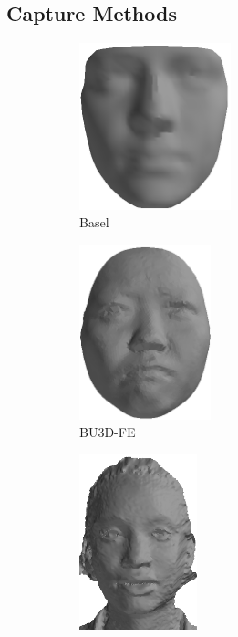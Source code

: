 \subsection{Capture Methods}\label{subsec:bg_capture}
\begin{figure}[h]
	\centering
	\begin{subfigure}[b]{0.3\textwidth}
		\centering
		\includegraphics[height=1.9in]{background/images/basel}
		\caption{Basel~\cite{paysan20093d}}\label{fig:db_examples_basel}
	\end{subfigure}
	\begin{subfigure}[b]{0.3\textwidth}
		\centering
		\includegraphics[height=2in]{background/images/bu3d}
		\caption{BU3D-FE~\cite{Yin:2006cc}}\label{fig:db_examples_bu3d}
	\end{subfigure}
	\begin{subfigure}[b]{0.3\textwidth}
		\centering
		\includegraphics[height=2in]{background/images/bp4d}

\end{subfigure}
\end{figure}
